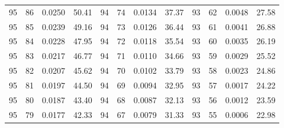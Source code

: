 \begin{tabular}{llll|llll|llll}
95 & 86 & 0.0250 & 50.41 & 94 & 74 & 0.0134 & 37.37 & 93 & 62 & 0.0048 & 27.58\\
95 & 85 & 0.0239 & 49.16 & 94 & 73 & 0.0126 & 36.44 & 93 & 61 & 0.0041 & 26.88\\
95 & 84 & 0.0228 & 47.95 & 94 & 72 & 0.0118 & 35.54 & 93 & 60 & 0.0035 & 26.19\\
95 & 83 & 0.0217 & 46.77 & 94 & 71 & 0.0110 & 34.66 & 93 & 59 & 0.0029 & 25.52\\
95 & 82 & 0.0207 & 45.62 & 94 & 70 & 0.0102 & 33.79 & 93 & 58 & 0.0023 & 24.86\\
95 & 81 & 0.0197 & 44.50 & 94 & 69 & 0.0094 & 32.95 & 93 & 57 & 0.0017 & 24.22\\
95 & 80 & 0.0187 & 43.40 & 94 & 68 & 0.0087 & 32.13 & 93 & 56 & 0.0012 & 23.59\\
95 & 79 & 0.0177 & 42.33 & 94 & 67 & 0.0079 & 31.33 & 93 & 55 & 0.0006 & 22.98\\
\bottomrule
\end{tabular}
\newpage
